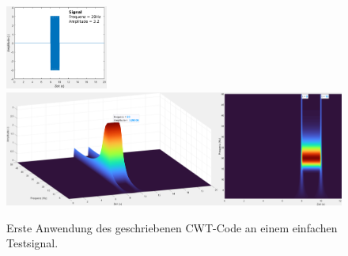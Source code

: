 \begin{figure}
	\centering
	\includegraphics[width=0.3\textwidth]{papers/wavelets/images/8_BC_Signal.png}
	\includegraphics[width=\textwidth]{papers/wavelets/images/12-2_CWT-1Prog.png}
	\caption{Erste Anwendung des geschriebenen CWT-Code an einem einfachen Testsignal.}
	\label{wavelet:fig:ErsteAnwendung}
\end{figure}
